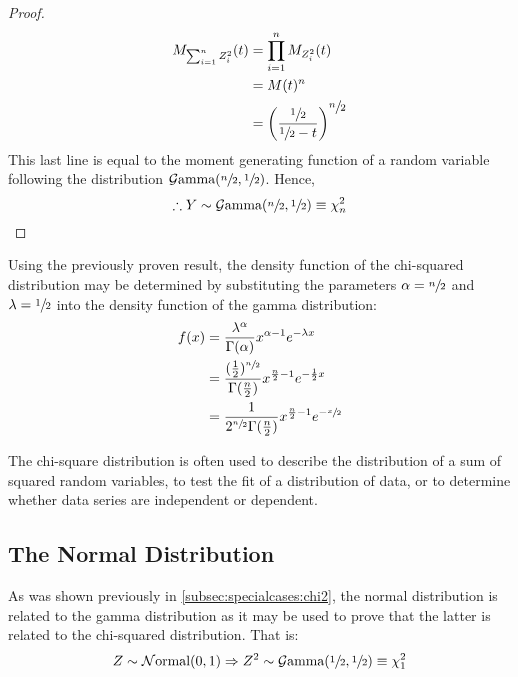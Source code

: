\documentclass[12pt]{article}
\newcommand{\G}{\mathcal{G}}
\newcommand{\N}{\mathcal{N}}
\begin{document}
\begin{proof}
\begin{equation}
		\begin{split}
			M_{\sum^n_{i=1}Z^2_i}(t)	&=	\prod^n_{i=1}M_{Z^2_i}(t)\\
										&=	M(t)^n\\
										&=	\left(\frac{\sfrac{1}{2}}{\sfrac{1}{2}-t}\right)^{\displaystyle\sfrac{n}{2}}
		\end{split}
	\end{equation}
	This last line is equal to the moment generating function of a random variable following the distribution
	$\G\text{amma}(\sfrac{n}{2}, \sfrac{1}{2})$. Hence,
	\begin{equation}
		\therefore Y\sim\G\text{amma}(\sfrac{n}{2}, \sfrac{1}{2})\equiv \chi^2_n
	\end{equation}
\end{proof}

Using the previously proven result, the density function of the chi-squared distribution may be determined by
substituting the parameters $\alpha = \sfrac{n}{2}$ and $\lambda = \sfrac{1}{2}$ into the density function of the gamma
distribution:
\begin{equation}\label{eq:chisquared-density}
	\begin{split}
		f(x)	&=	\frac{\lambda^\alpha}{\Gamma(\alpha)}x^{\alpha-1}e^{-\lambda x}\\
				&=	\frac{(\frac{1}{2})^{\sfrac{n}{2}}}{\Gamma(\frac{n}{2})}x^{\frac{n}{2}-1}e^{-\frac{1}{2}x}\\
				&=	\frac{1}{2^{\sfrac{n}{2}}\Gamma(\frac{n}{2})}x^{\frac{n}{2}-1}e^{-\sfrac{x}{2}}
	\end{split}
\end{equation}

The chi-square distribution is often used to describe the distribution of a sum of squared random variables, to test the
fit of a distribution of data, or to determine whether data series are independent or dependent.


\pagebreak
\subsection{The Normal Distribution}\label{subsec:specialcases:normal}
As was shown previously in \autoref{subsec:specialcases:chi2}, the normal distribution is related to the gamma
distribution as it may be used to prove that the latter is related to the chi-squared distribution. That is:
\begin{equation}
	Z\sim\N\text{ormal}(0, 1)\Rightarrow Z^2\sim\G\text{amma}(\sfrac{1}{2}, \sfrac{1}{2})\equiv\chi^2_1
\end{equation}
\end{document}
